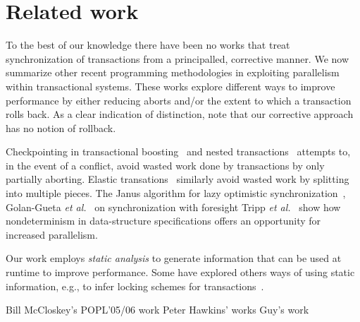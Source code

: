 \section{Related work}

To the best of our knowledge there have been no works that treat
synchronization of transactions from a principalled, corrective
manner. We now summarize other recent programming methodologies in
exploiting parallelism within transactional systems. These works
explore different ways to improve performance by either reducing
aborts and/or the extent to which a transaction rolls back. As a clear
indication of distinction, note that our corrective approach has no
notion of rollback.

Checkpointing in transactional boosting~\cite{spaa08a} and nested
transactions~\cite{ont,beeri} attempts to, in the event of a conflict,
avoid wasted work done by transactions by only partially
aborting. Elastic transations~\cite{FGG:DISC09} similarly avoid wasted
work by splitting into multiple pieces.  The Janus algorithm for lazy
optimistic synchronization~\cite{TMFS:PLDI12}, 
Golan-Gueta \emph{et al.}~\cite{GRSY:PLDI13} on synchronization with
foresight   Tripp \emph{et al.}~\cite{TKS:OOPSLA13} show
how nondeterminism in data-structure specifications offers an
opportunity for increased parallelism.



Our work employs \emph{static analysis} to generate information that
can be used at runtime to improve performance. Some have explored
others ways of using static information, e.g., to infer locking
schemes for transactions~\cite{gulwani}.

Bill McCloskey's POPL'05/06 work
Peter Hawkins' works
Guy's work


